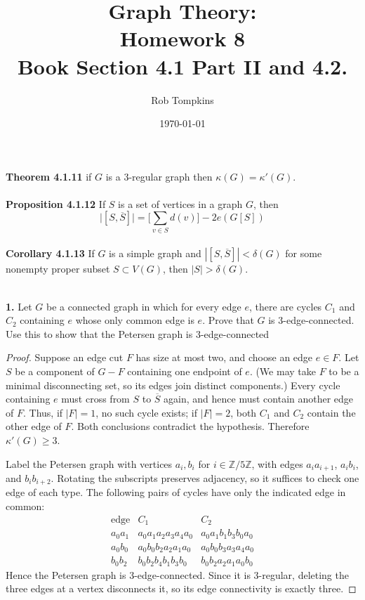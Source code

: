 \documentclass[12pt]{amsart}
\title{Graph Theory:\\Homework 8\\ Book Section 4.1 Part II and 4.2.}
\author{Rob Tompkins}
\date{\today}
\theoremstyle{conjecture}
\theoremstyle{definition}
\theoremstyle{question}
\theoremstyle{theorem}
\begin{document}
    \maketitle

    \noindent\textbf{Theorem 4.1.11} if $G$ is a 3-regular graph then $\kappa(G) = \kappa'(G)$.\\\\

    \noindent\textbf{Proposition 4.1.12} If $S$ is a set of vertices in a graph $G$, then
    \[
        \big|[S,\overline{S}]\big| = \Big[\sum_{v\in S}d(v)\Big] - 2e(G[S])
    \]
    \quad\\

    \noindent\textbf{Corollary 4.1.13} If $G$ is a simple graph and $|[S,\overline{S}]| < \delta(G)$ for some
    nonempty proper subset $S\subset V(G)$, then $|S| > \delta(G)$.

    \quad\\

    \noindent\textbf{1.} Let $G$ be a connected graph in which for every edge $e$, there are cycles $C_1$
    and $C_2$ containing $e$ whose only common edge is $e$.
    Prove that $G$ is 3-edge-connected.
    Use this to show that the Petersen graph is 3-edge-connected

    \begin{proof}

        Suppose an edge cut $F$ has size at most two, and choose an edge
        $e\in F$. Let $S$ be a component of $G-F$ containing one endpoint
        of $e$. (We may take $F$ to be a minimal disconnecting set, so its
        edges join distinct components.) Every cycle containing $e$ must
        cross from $S$ to $\overline S$ again, and hence must contain another
        edge of $F$. Thus, if $|F|=1$, no such cycle exists; if $|F|=2$,
        both $C_1$ and $C_2$ contain the other edge of $F$. Both conclusions
        contradict the hypothesis. Therefore $\kappa'(G)\ge 3$.

        Label the Petersen graph with vertices $a_i,b_i$ for
        $i\in\mathbb Z/5\mathbb Z$, with edges $a_i a_{i+1}$,
        $a_i b_i$, and $b_i b_{i+2}$. Rotating the subscripts preserves
        adjacency, so it suffices to check one edge of each type.
        The following pairs of cycles have only the indicated edge in common:
        \[
        \begin{array}{c|l|l}
        \text{edge}&C_1&C_2\\ \hline
        a_0a_1&a_0a_1a_2a_3a_4a_0&a_0a_1b_1b_3b_0a_0\\
        a_0b_0&a_0b_0b_2a_2a_1a_0&a_0b_0b_3a_3a_4a_0\\
        b_0b_2&b_0b_2b_4b_1b_3b_0&b_0b_2a_2a_1a_0b_0
        \end{array}
        \]
        Hence the Petersen graph is 3-edge-connected. Since it is
        3-regular, deleting the three edges at a vertex disconnects it,
        so its edge connectivity is exactly three.
    \end{proof}
\end{document}

